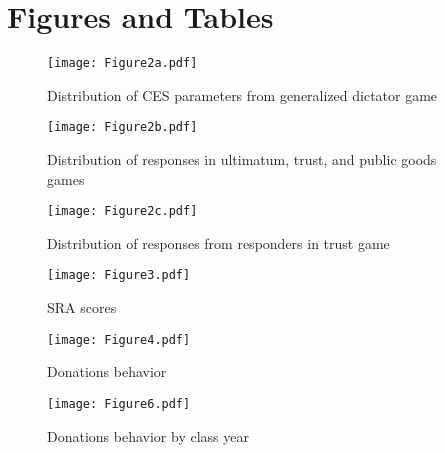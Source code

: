 \section{Figures and Tables}

\begin{figure}[H]
	\centering
	\caption{Distribution of CES parameters from generalized dictator game}
	\texttt{[image: Figure2a.pdf]} 
\end{figure}

\begin{figure}[H]
	\centering
	\caption{Distribution of responses in ultimatum, trust, and public goods games}
	\texttt{[image: Figure2b.pdf]} 
\end{figure}


\begin{figure}[H]
	\centering
	\caption{Distribution of responses from responders in trust game}
	\texttt{[image: Figure2c.pdf]} 
\end{figure}

\begin{figure}[H]
	\centering
	\caption{SRA scores}
	\texttt{[image: Figure3.pdf]} 
\end{figure}

\begin{figure}[H]
	\centering
	\caption{Donations behavior}
	\texttt{[image: Figure4.pdf]} 
\end{figure}

\begin{figure}[H]
	\centering
	\caption{Donations behavior by class year}
	\texttt{[image: Figure6.pdf]} 
\end{figure}

\newpage


